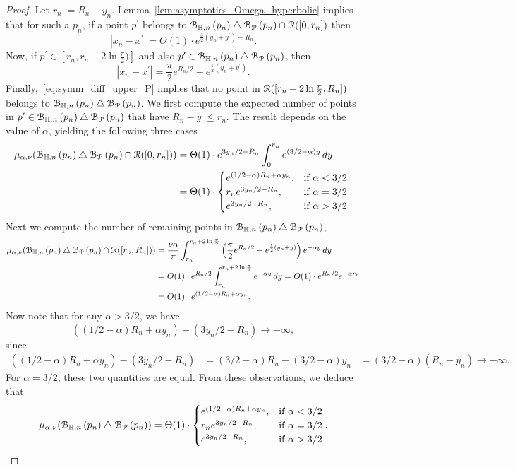 \begin{proof}
Let $r_n := R_n - y_n$. Lemma~\ref{lem:asymptotics_Omega_hyperbolic} implies that for such a $p_n$, if a point $p^\prime$ belongs to ${\mathcal B}_{\mathbb{H},n}\left(p_n\right) \bigtriangleup {\mathcal B}_{{\mathcal P}}\left(p_n\right) \cap {\mathcal R} ([0,r_n])$ then 
\[
	|x_n - x^\prime| = \Theta(1) \cdot e^{\frac{3}{2} (y_n + y^\prime) - R_n}.
\]
Now, if $p^\prime \in [r_n, r_n + 2 \ln \frac{\pi}{2})]$ and also $p^\prime \in {\mathcal B}_{\mathbb{H},n}\left(p_n\right) \bigtriangleup {\mathcal B}_{{\mathcal P}}\left(p_n\right)$, then 
\[
	|x_n-x^\prime| =\frac{\pi}{2} e^{R_n/2} - e^{\frac{1}{2} (y_n + y^\prime)}.
\]
Finally,~\eqref{eq:symm_diff_upper_P} implies that no point in ${\mathcal R} ([r_n+2\ln \frac{\pi}{2},R_n])$ belongs to ${\mathcal B}_{\mathbb{H},n}\left(p_n\right) \bigtriangleup {\mathcal B}_{{\mathcal P}}\left(p_n\right)$. We first compute the expected number of points in $p^\prime \in {\mathcal B}_{\mathbb{H},n}\left(p_n\right) \bigtriangleup {\mathcal B}_{{\mathcal P}}\left(p_n\right)$ that have $R_n - y^\prime \le r_n$. The result depends on the value of $\alpha$, yielding the following three cases
\begin{align*}
	\mu_{\alpha,\nu} ({\mathcal B}_{\mathbb{H},n}\left(p_n\right) \bigtriangleup {\mathcal B}_{{\mathcal P}}\left(p_n\right) \cap {\mathcal R} ([0,r_n])) 
	&= \Theta(1) \cdot e^{3y_n/2 - R_n}\int_0^{r_n} e^{(3/2-\alpha) y} \, dy \\
	&= \Theta(1)\cdot \begin{cases} e^{(1/2-\alpha)R_n + \alpha y_n}, & \mbox{if } \alpha < 3/2 \\
		r_n e^{3y_n/2 - R_n}, & \mbox{if }\alpha = 3/2\\
		e^{3y_n/2 - R_n}, &  \mbox{if } \alpha > 3/2
	\end{cases}.
\end{align*}
Next we compute the number of remaining points in ${\mathcal B}_{\mathbb{H},n}\left(p_n\right) \bigtriangleup {\mathcal B}_{{\mathcal P}}\left(p_n\right)$, 
\begin{align*}
	\mu_{\alpha,\nu} ({\mathcal B}_{\mathbb{H},n}\left(p_n\right) \bigtriangleup {\mathcal B}_{{\mathcal P}}\left(p_n\right) \cap {\mathcal R} ([r_n, R_n])) 
	&= \frac{\nu\alpha}{\pi} \int_{r_n}^{r_n + 2 \ln \frac{\pi}{2}} 
		\left(\frac{\pi}{2} e^{R_n/2} - e^{\frac{1}{2} (y_n + y)}\right)e^{-\alpha y} \, dy \\
	&= O(1) \cdot e^{R_n/2} \int_{r_n}^{r_n + 2 \ln \frac{\pi}{2}} e^{-\alpha y} \, dy 
		= O(1) \cdot e^{R_n/2} e^{-\alpha r_n} \\
	&=O(1) \cdot e^{(1/2 - \alpha) R_n + \alpha y_n}.
\end{align*}
Now note that for any $\alpha > 3/2$, we have 
\[
	\left( (1/2 - \alpha) R_n + \alpha y_n\right) - \left(3y_n/2 - R_n \right)\to -\infty,
\]
since
\begin{align*}
	\left( (1/2 - \alpha) R_n + \alpha y_n\right) - \left(3y_n/2 - R_n \right) 
	&= (3/2-\alpha )R_n - (3/2 - \alpha) y_n 
	&= (3/2 -\alpha) (R_n- y_n) \to -\infty.
\end{align*}
For $\alpha = 3/2$, these two quantities are equal. From these observations, we deduce that 
\[
	\mu_{\alpha,\nu} ({\mathcal B}_{\mathbb{H},n}\left(p_n\right) \bigtriangleup {\mathcal B}_{{\mathcal P}}\left(p_n\right) ) 
	= \Theta (1) \cdot \begin{cases} 
		e^{(1/2-\alpha)R_n + \alpha y_n}, & \mbox{if } \alpha < 3/2 \\
		r_n e^{3y_n/2 - R_n}, & \mbox{if }\alpha = 3/2\\
		e^{3y_n/2 - R_n}, &  \mbox{if } \alpha > 3/2 
	\end{cases}.
\]
\end{proof}


